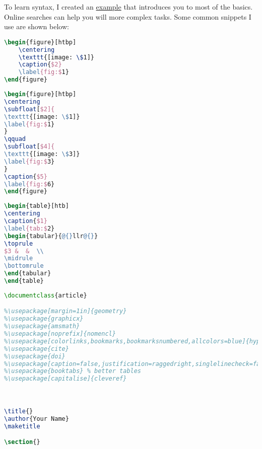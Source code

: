 To learn syntax, I created an \href{https://www.overleaf.com/latex/examples/a-simple-example-for-me-en-575/tmvvshzxypsj#share}{example} that introduces you to most of the basics.  Online searches can help you will more complex tasks.  Some common snippets I use are shown below:

\begin{lstlisting}[language=tex,caption={Figure}]
\begin{figure}[htbp]
    \centering
    \texttt{[image: \$1]}
    \caption{$2}
    \label{fig:$1}
\end{figure}
\end{lstlisting}


\begin{lstlisting}[language=TeX,caption={Subfigure}]
\begin{figure}[htbp]
\centering
\subfloat[$2]{
\texttt{[image: \$1]}
\label{fig:$1}
}
\qquad
\subfloat[$4]{
\texttt{[image: \$3]}
\label{fig:$3}
}
\caption{$5}
\label{fig:$6}
\end{figure}
\end{lstlisting}

\begin{lstlisting}[language=tex,caption={Table}]
\begin{table}[htb]
\centering
\caption{$1}
\label{tab:$2}
\begin{tabular}{@{}llr@{}}
\toprule
$3 &  &  \\
\midrule
\bottomrule
\end{tabular}
\end{table}
\end{lstlisting}

\begin{lstlisting}[language=tex,caption={Header}]
\documentclass{article}

%\usepackage[margin=1in]{geometry}
%\usepackage{graphicx}
%\usepackage{amsmath}
%\usepackage[noprefix]{nomencl}
%\usepackage[colorlinks,bookmarks,bookmarksnumbered,allcolors=blue]{hyperref}
%\usepackage{cite}
%\usepackage{doi}
%\usepackage[caption=false,justification=raggedright,singlelinecheck=false]{subfig}
%\usepackage{booktabs} % better tables
%\usepackage[capitalise]{cleveref}



\title{}
\author{Your Name}
\maketitle

\section{}


\end{lstlisting}


